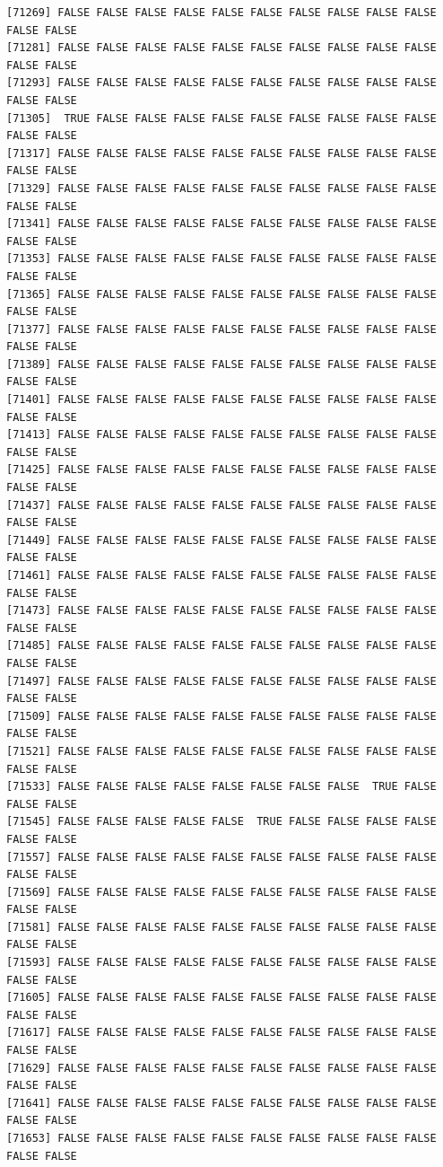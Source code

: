 \documentclass[
  a4paper,
  DIV=11,
  numbers=noendperiod]{scrartcl}
\begin{document}
\begin{verbatim}
[71269] FALSE FALSE FALSE FALSE FALSE FALSE FALSE FALSE FALSE FALSE FALSE FALSE
[71281] FALSE FALSE FALSE FALSE FALSE FALSE FALSE FALSE FALSE FALSE FALSE FALSE
[71293] FALSE FALSE FALSE FALSE FALSE FALSE FALSE FALSE FALSE FALSE FALSE FALSE
[71305]  TRUE FALSE FALSE FALSE FALSE FALSE FALSE FALSE FALSE FALSE FALSE FALSE
[71317] FALSE FALSE FALSE FALSE FALSE FALSE FALSE FALSE FALSE FALSE FALSE FALSE
[71329] FALSE FALSE FALSE FALSE FALSE FALSE FALSE FALSE FALSE FALSE FALSE FALSE
[71341] FALSE FALSE FALSE FALSE FALSE FALSE FALSE FALSE FALSE FALSE FALSE FALSE
[71353] FALSE FALSE FALSE FALSE FALSE FALSE FALSE FALSE FALSE FALSE FALSE FALSE
[71365] FALSE FALSE FALSE FALSE FALSE FALSE FALSE FALSE FALSE FALSE FALSE FALSE
[71377] FALSE FALSE FALSE FALSE FALSE FALSE FALSE FALSE FALSE FALSE FALSE FALSE
[71389] FALSE FALSE FALSE FALSE FALSE FALSE FALSE FALSE FALSE FALSE FALSE FALSE
[71401] FALSE FALSE FALSE FALSE FALSE FALSE FALSE FALSE FALSE FALSE FALSE FALSE
[71413] FALSE FALSE FALSE FALSE FALSE FALSE FALSE FALSE FALSE FALSE FALSE FALSE
[71425] FALSE FALSE FALSE FALSE FALSE FALSE FALSE FALSE FALSE FALSE FALSE FALSE
[71437] FALSE FALSE FALSE FALSE FALSE FALSE FALSE FALSE FALSE FALSE FALSE FALSE
[71449] FALSE FALSE FALSE FALSE FALSE FALSE FALSE FALSE FALSE FALSE FALSE FALSE
[71461] FALSE FALSE FALSE FALSE FALSE FALSE FALSE FALSE FALSE FALSE FALSE FALSE
[71473] FALSE FALSE FALSE FALSE FALSE FALSE FALSE FALSE FALSE FALSE FALSE FALSE
[71485] FALSE FALSE FALSE FALSE FALSE FALSE FALSE FALSE FALSE FALSE FALSE FALSE
[71497] FALSE FALSE FALSE FALSE FALSE FALSE FALSE FALSE FALSE FALSE FALSE FALSE
[71509] FALSE FALSE FALSE FALSE FALSE FALSE FALSE FALSE FALSE FALSE FALSE FALSE
[71521] FALSE FALSE FALSE FALSE FALSE FALSE FALSE FALSE FALSE FALSE FALSE FALSE
[71533] FALSE FALSE FALSE FALSE FALSE FALSE FALSE FALSE  TRUE FALSE FALSE FALSE
[71545] FALSE FALSE FALSE FALSE FALSE  TRUE FALSE FALSE FALSE FALSE FALSE FALSE
[71557] FALSE FALSE FALSE FALSE FALSE FALSE FALSE FALSE FALSE FALSE FALSE FALSE
[71569] FALSE FALSE FALSE FALSE FALSE FALSE FALSE FALSE FALSE FALSE FALSE FALSE
[71581] FALSE FALSE FALSE FALSE FALSE FALSE FALSE FALSE FALSE FALSE FALSE FALSE
[71593] FALSE FALSE FALSE FALSE FALSE FALSE FALSE FALSE FALSE FALSE FALSE FALSE
[71605] FALSE FALSE FALSE FALSE FALSE FALSE FALSE FALSE FALSE FALSE FALSE FALSE
[71617] FALSE FALSE FALSE FALSE FALSE FALSE FALSE FALSE FALSE FALSE FALSE FALSE
[71629] FALSE FALSE FALSE FALSE FALSE FALSE FALSE FALSE FALSE FALSE FALSE FALSE
[71641] FALSE FALSE FALSE FALSE FALSE FALSE FALSE FALSE FALSE FALSE FALSE FALSE
[71653] FALSE FALSE FALSE FALSE FALSE FALSE FALSE FALSE FALSE FALSE FALSE FALSE

\end{verbatim}
\end{document}
